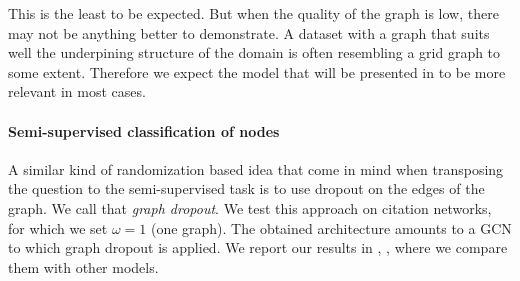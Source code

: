 This is the least to be expected. But when the quality of the graph is low, there may not be anything better to demonstrate. A dataset with a graph that suits well the underpining structure of the domain is often resembling a grid graph to some extent. Therefore we expect the model that will be presented in  to be more relevant in most cases.

\paragraph{Semi-supervised classification of nodes}

A similar kind of randomization based idea that come in mind when transposing the question to the semi-supervised task is to use dropout on the edges of the graph. We call that \emph{graph dropout}. We test this approach on citation networks, for which we set $\omega = 1$ (\ie one graph). The obtained architecture amounts to a GCN \citep{kipf2016semi} to which graph dropout is applied. We report our results in , , where we compare them with other models.





